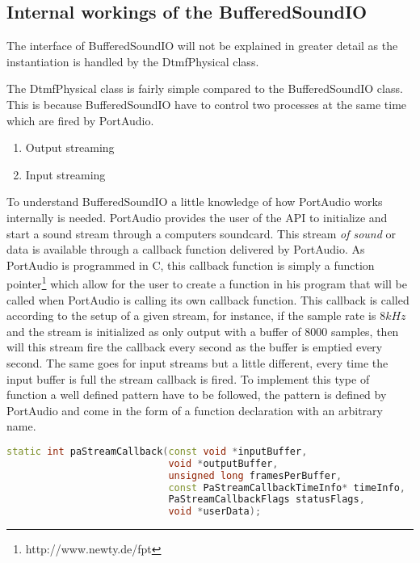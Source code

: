 	\subsection{Internal workings of the BufferedSoundIO}
	The interface of BufferedSoundIO will not be explained in greater detail as the instantiation is handled by the DtmfPhysical class.
	
	The DtmfPhysical class is fairly simple compared to the BufferedSoundIO class. This is because BufferedSoundIO have to control two processes
	at the same time which are fired by PortAudio.
	
	\begin {enumerate}
	\item Output streaming
	\item Input streaming
	\end{enumerate}
	
	To understand BufferedSoundIO a little knowledge of how PortAudio works internally is needed. PortAudio provides the user of the API to initialize
	and start a sound stream through a computers soundcard. This stream \textit{of sound} or data is available through a callback function delivered
	by PortAudio. As PortAudio is programmed in C, this callback function is simply a function pointer\footnote{http://www.newty.de/fpt}
	which allow for the user to create a function in his program that will be called when PortAudio is calling its own callback function.
	This callback is called according to the setup of a given stream, for instance, if the sample rate is $8kHz$ and the stream is initialized as 
	only output with a buffer of 8000 samples, then will this stream fire the callback every second as the buffer is emptied every second.
	The same goes for input streams but a little different, every time the input buffer is full the stream callback is fired. To implement
	this type of function a well defined pattern have to be followed, the pattern is defined by PortAudio and come in the form of a
	function declaration with an arbitrary name. 
	
	\begin{lstlisting}[float=htb,language={C++},caption={PortAudios callback function declaration. This declaration is used for both input
	streams, output streams, and the two in combination.}]
static int paStreamCallback(const void *inputBuffer,
							void *outputBuffer,
							unsigned long framesPerBuffer,
							const PaStreamCallbackTimeInfo* timeInfo,
							PaStreamCallbackFlags statusFlags,
							void *userData);
	\end{lstlisting}\label{lst:pa_callback}
	
